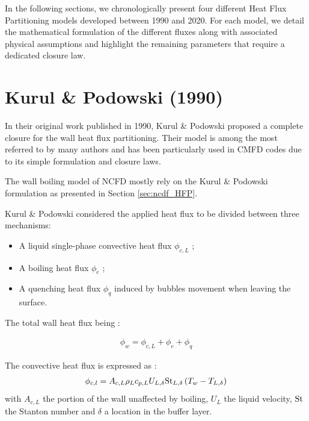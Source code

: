 \npar

In the following sections, we chronologically present four different Heat Flux Partitioning models developed between 1990 and 2020. For each model, we detail the mathematical formulation of the different fluxes along with associated physical assumptions and highlight the remaining parameters that require a dedicated closure law.


\section{Kurul \& Podowski (1990)}
\label{sec:hfp_kurul}


In their original work published in 1990, Kurul \& Podowski \cite{kurul_1990} proposed a complete closure for the wall heat flux partitioning. Their model is among the most referred to by many authors and has been particularly used in CMFD codes due to its simple formulation and closure laws.

\begin{note*}{}
The wall boiling model of NCFD mostly rely on the Kurul \& Podowski formulation as presented in Section \ref{sec:ncdf_HFP}.
\end{note*}


Kurul \& Podowski considered the applied heat flux to be divided between three mechanisms:

\begin{itemize}
\item A liquid single-phase convective heat flux $\phi_{c,L}$ ;
\item A boiling heat flux $\phi_{e}$ ;
\item A quenching heat flux $\phi_{q}$ induced by bubbles movement when leaving the surface.
\end{itemize}

The total wall heat flux being :

\begin{align}
\phi_{w}=\phi_{c,L}+\phi_{e}+\phi_{q}
\end{align}

The convective heat flux is expressed as :
\begin{align}
\phi_{c,l}=A_{c,L} \rho_{L} c_{p,L}U_{L,\delta} \mathrm{St}_{L,\delta}\left( T_{w}-T_{L,\delta} \right)
\label{eq:KP_hfp_phicL}
\end{align}
with $A_{c,L}$ the portion of the wall unaffected by boiling, $U_{L}$ the liquid velocity, $\mathrm{St}$ the Stanton number and $\delta$ a location in the buffer layer.

